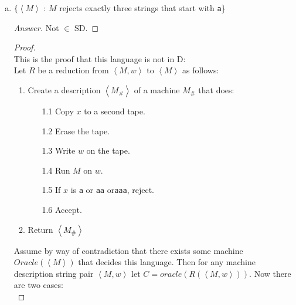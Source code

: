 \documentclass[10pt]{article}
\newcommand{\card}[1]{\left| #1 \right|}
\newcommand{\brackets}[1]{\left< #1 \right>}
\begin{document}
\begin{enumerate}[1)]
\begin{enumerate}[a)]
\begin{proof}[Proof]
Assume by way of contradiction that there exists some machine $Oracle(\brackets{M})$ that decides whether $M$ accepts all even length strings.  Then for any machine description string pair $\brackets{M, w}$ let $C = oracle(R(\brackets{M, w}))$. Now there are two cases:\\

If $\brackets{M, w} \in \lnot$ H: $M_\#$ accepts all strings, so it accepts all even length strings.  Oracle accepts.\\
If $\brackets{M, w} \not \in \lnot$ H: $M_\#$ does not accept on even length strings of length less than $\card{x}$.  Oracle rejects.\\

So $C$ decides $\lnot$ H.  Therefore $Oracle$ does not exist.
\end{proof}

\pagebreak
\item
$\{\brackets{M}$ : $M$ rejects exactly three strings that start with \texttt{a}\}
\begin{proof}[Answer]
Not $\in$ SD.
\end{proof}
\begin{proof}[Proof]$ $\\
This is the proof that this language is not in D:\\

Let $R$ be a reduction from $\brackets{M, w}$ to $\brackets{M}$ as follows:
\begin{enumerate}[1.]
\item
Create a description $\brackets{M_\#}$ of a machine $M_\#$ that does:
\begin{enumerate}
\item[1.1]
Copy $x$ to a second tape.

\item[1.2]
Erase the tape.

\item[1.3]
Write $w$ on the tape.

\item[1.4]
Run $M$ on $w$.

\item[1.5]
If $x$ is \texttt{a} or \texttt{aa} or\texttt{aaa}, reject.

\item[1.6]
Accept.
\end{enumerate}
\item
Return $\brackets{M_\#}$
\end{enumerate}

Assume by way of contradiction that there exists some machine $Oracle(\brackets{M})$ that decides this language.  Then for any machine description string pair $\brackets{M, w}$ let $C = oracle(R(\brackets{M, w}))$. Now there are two cases:\\


\end{proof}
\end{enumerate}
\end{enumerate}
\end{document}
